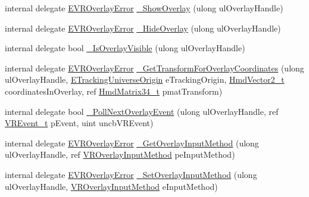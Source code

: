 \begin{DoxyCompactItemize}
\item 
internal delegate \mbox{\hyperlink{namespace_valve_1_1_v_r_aaee5c5144f42b7969d45b854f51b0c18}{E\+V\+R\+Overlay\+Error}} \mbox{\hyperlink{struct_valve_1_1_v_r_1_1_i_v_r_overlay_a4790f23bb779178e96a7b54765d0406f}{\+\_\+\+Show\+Overlay}} (ulong ul\+Overlay\+Handle)
\item 
internal delegate \mbox{\hyperlink{namespace_valve_1_1_v_r_aaee5c5144f42b7969d45b854f51b0c18}{E\+V\+R\+Overlay\+Error}} \mbox{\hyperlink{struct_valve_1_1_v_r_1_1_i_v_r_overlay_aa37a48da1e178713f92a56c045d5b50e}{\+\_\+\+Hide\+Overlay}} (ulong ul\+Overlay\+Handle)
\item 
internal delegate bool \mbox{\hyperlink{struct_valve_1_1_v_r_1_1_i_v_r_overlay_afc7823ac1ca911ba5de47113a72d3930}{\+\_\+\+Is\+Overlay\+Visible}} (ulong ul\+Overlay\+Handle)
\item 
internal delegate \mbox{\hyperlink{namespace_valve_1_1_v_r_aaee5c5144f42b7969d45b854f51b0c18}{E\+V\+R\+Overlay\+Error}} \mbox{\hyperlink{struct_valve_1_1_v_r_1_1_i_v_r_overlay_a5b737a48531e2ce68c2dc7f2a6e374f9}{\+\_\+\+Get\+Transform\+For\+Overlay\+Coordinates}} (ulong ul\+Overlay\+Handle, \mbox{\hyperlink{namespace_valve_1_1_v_r_a29be99a3c2f780157bd490db06a7f12f}{E\+Tracking\+Universe\+Origin}} e\+Tracking\+Origin, \mbox{\hyperlink{struct_valve_1_1_v_r_1_1_hmd_vector2__t}{Hmd\+Vector2\+\_\+t}} coordinates\+In\+Overlay, ref \mbox{\hyperlink{struct_valve_1_1_v_r_1_1_hmd_matrix34__t}{Hmd\+Matrix34\+\_\+t}} pmat\+Transform)
\item 
internal delegate bool \mbox{\hyperlink{struct_valve_1_1_v_r_1_1_i_v_r_overlay_aff9a0bf6a3969b29ae3af67dc6991c28}{\+\_\+\+Poll\+Next\+Overlay\+Event}} (ulong ul\+Overlay\+Handle, ref \mbox{\hyperlink{struct_valve_1_1_v_r_1_1_v_r_event__t}{V\+R\+Event\+\_\+t}} p\+Event, uint uncb\+V\+R\+Event)
\item 
internal delegate \mbox{\hyperlink{namespace_valve_1_1_v_r_aaee5c5144f42b7969d45b854f51b0c18}{E\+V\+R\+Overlay\+Error}} \mbox{\hyperlink{struct_valve_1_1_v_r_1_1_i_v_r_overlay_a0144a0a15ffc7d02c585198bc2cdcc7c}{\+\_\+\+Get\+Overlay\+Input\+Method}} (ulong ul\+Overlay\+Handle, ref \mbox{\hyperlink{namespace_valve_1_1_v_r_a43f4e4c6980efb8b0d2a954640203d74}{V\+R\+Overlay\+Input\+Method}} pe\+Input\+Method)
\item 
internal delegate \mbox{\hyperlink{namespace_valve_1_1_v_r_aaee5c5144f42b7969d45b854f51b0c18}{E\+V\+R\+Overlay\+Error}} \mbox{\hyperlink{struct_valve_1_1_v_r_1_1_i_v_r_overlay_ab00e26696ac1201e4fb257bb32fb2557}{\+\_\+\+Set\+Overlay\+Input\+Method}} (ulong ul\+Overlay\+Handle, \mbox{\hyperlink{namespace_valve_1_1_v_r_a43f4e4c6980efb8b0d2a954640203d74}{V\+R\+Overlay\+Input\+Method}} e\+Input\+Method)

\end{DoxyCompactItemize}

